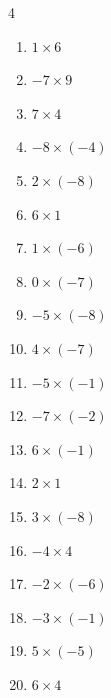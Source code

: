 \begin{multicols}{4}
\begin{enumerate}
  \item $1\times 6$
        \phantom{$=6$}

  \item $-7\times 9$
        \phantom{$=-63$}

  \item $7\times 4$
        \phantom{$=28$}

  \item $-8\times (-4)$
        \phantom{$=32$}

  \item $2\times (-8)$
        \phantom{$=-16$}

  \item $6\times 1$
        \phantom{$=6$}

  \item $1\times (-6)$
        \phantom{$=-6$}

  \item $0\times (-7)$
        \phantom{$=0$}

  \item $-5\times (-8)$
        \phantom{$=40$}

  \item $4\times (-7)$
        \phantom{$=-28$}

  \item $-5\times (-1)$
        \phantom{$=5$}

  \item $-7\times (-2)$
        \phantom{$=14$}

  \item $6\times (-1)$
        \phantom{$=-6$}

  \item $2\times 1$
        \phantom{$=2$}

  \item $3\times (-8)$
        \phantom{$=-24$}

  \item $-4\times 4$
        \phantom{$=-16$}

  \item $-2\times (-6)$
        \phantom{$=12$}

  \item $-3\times (-1)$
        \phantom{$=3$}

\columnbreak %

  \item $5\times (-5)$
        \phantom{$=-25$}

  \item $6\times 4$
        \phantom{$=24$}


\end{enumerate}
\end{multicols}
